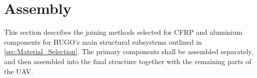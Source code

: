 \section{Assembly}
\label{sec:Assembly}
This section describes the joining methods selected for CFRP and aluminium components for HUGO's main structural subsystems outlined in \autoref{sec:Material_Selection}. The primary components shall be assembled separately, and then assembled into the final structure together with the remaining parts of the UAV. 

